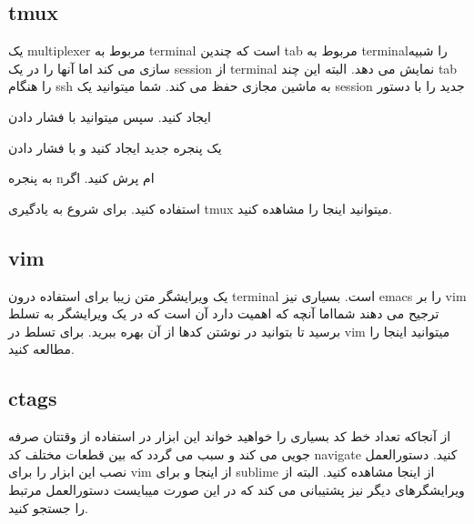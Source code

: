 \subsection{tmux}
یک multiplexer مربوط به terminal است که چندین tab مربوط به terminalرا شبیه سازی می کند اما آنها را در یک session از terminal نمایش می دهد. البته این چند tab را هنگام ssh به ماشین مجازی حفظ می کند.
شما میتوانید یک session جدید را با دستور \begin{flushleft}
\end{flushleft} ایجاد کنید. سپس میتوانید با فشار دادن \begin{flushleft}
\end{flushleft} یک پنجره جدید ایجاد کنید و با فشار دادن \begin{flushleft}
\end{flushleft} به پنجره nام پرش کنید.
اگر  استفاده کنید.
برای شروع به یادگیری tmux میتوانید اینجا را مشاهده کنید.

\subsection{vim}
یک ویرایشگر متن زیبا برای استفاده درون terminal است. بسیاری نیز emacs را بر vim ترجیح می دهند شمااما آنچه که اهمیت دارد آن است که در یک ویرایشگر به تسلط برسید تا بتوانید در نوشتن کدها از آن بهره ببرید. برای تسلط در vim میتوانید اینجا را مطالعه کنید.

\subsection{ctags}
از آنجاکه تعداد خط کد بسیاری را خواهید خواند این ابزار در استفاده از وقتتان صرفه جویی می کند و سبب می گردد که بین قطعات مختلف کد navigate کنید.
دستورالعمل نصب این ابزار را برای vim از اینجا و برای sublime از اینجا مشاهده کنید. البته از ویرایشگرهای دیگر نیز پشتیبانی می کند که در این صورت میبایست دستورالعمل مرتبط را جستجو کنید.